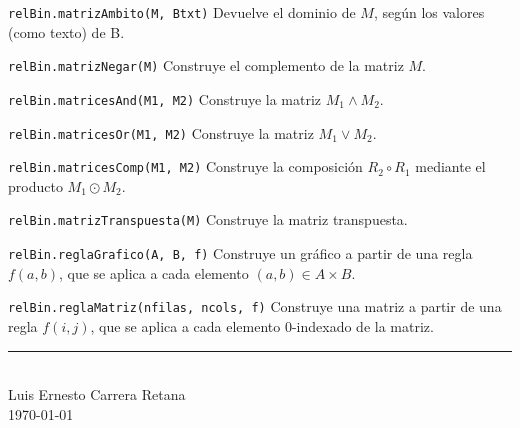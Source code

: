 \documentclass[10pt,landscape]{article}
\begin{document}
\begin{multicols}{3}
\begin{asparaitem}
\item \verb|relBin.matrizAmbito(M, Btxt)| 
  Devuelve el dominio de $M$, seg\'un los valores (como texto) de B.

\item \verb|relBin.matrizNegar(M)|
  Construye el complemento de la matriz $M$.

\item \verb|relBin.matricesAnd(M1, M2)|
  Construye la matriz $M_1 \land M_2$.

\item \verb|relBin.matricesOr(M1, M2)|
  Construye la matriz $M_1 \lor M_2$.

\item \verb|relBin.matricesComp(M1, M2)|
  Construye la composici\'on $R_2 \circ R_1$ mediante el producto $M_1 \odot M_2$.

\item \verb|relBin.matrizTranspuesta(M)|
  Construye la matriz transpuesta.
  
\item \verb|relBin.reglaGrafico(A, B, f)|
  Construye un gr\'afico a partir de una regla $f(a,b)$, que se aplica a cada elemento $(a,b)\in A\times B$.
  
\item \verb|relBin.reglaMatriz(nfilas, ncols, f)|
  Construye una matriz a partir de una regla $f(i,j)$, que se aplica a cada elemento 0-indexado de la matriz.
\end{asparaitem}

\rule{0.3\linewidth}{0.25pt}
\scriptsize \\
Luis Ernesto Carrera Retana \\
\today
\end{multicols}
\end{document}
